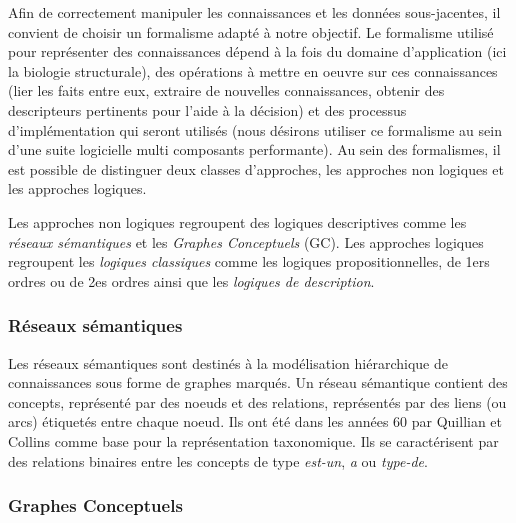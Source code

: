 Afin de correctement manipuler les connaissances et les données sous-jacentes, il convient de choisir un formalisme adapté à notre objectif. Le formalisme utilisé pour représenter des connaissances dépend à la fois du domaine d'application (ici la biologie structurale), des opérations à mettre en oeuvre sur ces connaissances (lier les faits entre eux, extraire de nouvelles connaissances, obtenir des descripteurs pertinents pour l'aide à la décision) et des processus d'implémentation qui seront utilisés (nous désirons utiliser ce formalisme au sein d'une suite logicielle multi composants performante). Au sein des formalismes, il est possible de distinguer deux classes d'approches, les approches non logiques et les approches logiques.

Les approches non logiques regroupent des logiques descriptives comme les \textit{réseaux sémantiques} et les \textit{Graphes Conceptuels} (GC).
Les approches logiques regroupent les \textit{logiques classiques} comme les logiques propositionnelles, de 1ers ordres ou de 2es ordres ainsi que les \textit{logiques de description}.

\subsubsection{Réseaux sémantiques}

Les réseaux sémantiques sont destinés à la modélisation hiérarchique de connaissances sous forme de graphes marqués. Un réseau sémantique contient des concepts, représenté par des noeuds et des relations, représentés par des liens (ou arcs) étiquetés entre chaque noeud. Ils ont été dans les années 60 par Quillian et Collins \cite{collins1969retrieval} comme base pour la représentation taxonomique. Ils se caractérisent par des relations binaires entre les concepts de type \textit{est-un}, \textit{a} ou \textit{type-de}.

\subsubsection{Graphes Conceptuels}

